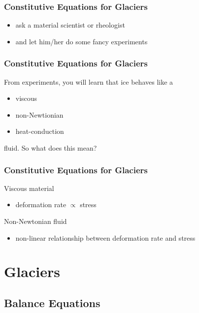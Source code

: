 \documentclass[hide notes,intlimits]{beamer}
\begin{document}
\begin{frame}
  \frametitle{Constitutive Equations for Glaciers}
  \begin{itemize}
    \item ask a material scientist or rheologist
    \item and let him/her do some fancy experiments
 \end{itemize}
\end{frame}


\begin{frame}
  \frametitle{Constitutive Equations for Glaciers}
  From experiments, you will learn that ice behaves like a
  \begin{itemize}
    \item viscous
    \item non-Newtionian
    \item heat-conduction
 \end{itemize}
fluid. So what does this mean?
\end{frame}


\begin{frame}
  \frametitle{Constitutive Equations for Glaciers}
  \begin{block}{Viscous material}
 \begin{itemize}
    \item deformation rate $\propto$ stress
\end{itemize}
 \end{block}
  \begin{block}{Non-Newtonian fluid}
 \begin{itemize}
    \item non-linear relationship between deformation rate and stress
\end{itemize}
 \end{block}
\end{frame}


\section{Glaciers}


\subsection{Balance Equations}
\end{document}
